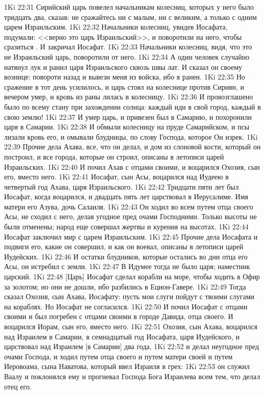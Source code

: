 \vs 1Ki 22:31 Сирийский царь повелел начальникам колесниц, которых у него было тридцать два, сказав: не сражайтесь ни с малым, ни с великим, а только с одним царем Израильским.
\vs 1Ki 22:32 Начальники колесниц, увидев Иосафата, подумали: <<верно это царь Израильский>>, и поворотили на него, чтобы сразиться . И закричал Иосафат.
\vs 1Ki 22:33 Начальники колесниц, видя, что это не Израильский царь, поворотили от него.
\vs 1Ki 22:34 А один человек случайно натянул лук и ранил царя Израильского сквозь швы лат. И сказал он своему вознице: повороти назад и вывези меня из войска, ибо я ранен.
\vs 1Ki 22:35 Но сражение в тот день усилилось, и царь стоял на колеснице против Сириян, и вечером умер, и кровь из раны лилась в колесницу.
\vs 1Ki 22:36 И провозглашено было по всему стану при захождении солнца: каждый иди в свой город, каждый в свою землю!
\vs 1Ki 22:37 И умер царь, и привезен был в Самарию, и похоронили царя в Самарии.
\vs 1Ki 22:38 И обмыли колесницу на пруде Самарийском, и псы лизали кровь его, и омывали блудницы, по слову Господа, которое Он изрек.
\rsbpar\vs 1Ki 22:39 Прочие дела Ахава, все, что он делал, и дом из слоновой кости, который он построил, и все города, которые он строил, описаны в летописи царей Израильских.
\vs 1Ki 22:40 И почил Ахав с отцами своими, и воцарился Охозия, сын его, вместо него.
\rsbpar\vs 1Ki 22:41 Иосафат, сын Асы, воцарился над Иудеею в четвертый год Ахава, царя Израильского.
\vs 1Ki 22:42 Тридцати пяти лет был Иосафат, когда воцарился, и двадцать пять лет царствовал в Иерусалиме. Имя матери его Азува, дочь Салаиля.
\vs 1Ki 22:43 Он ходил во всем путем отца своего Асы, не сходил с него, делая угодное пред очами Господними. Только высоты не были отменены; народ еще совершал жертвы и курения на высотах.
\vs 1Ki 22:44 Иосафат заключил мир с царем Израильским.
\rsbpar\vs 1Ki 22:45 Прочие дела Иосафата и подвиги его, какие он совершил, и как он воевал, описаны в летописи царей Иудейских.
\vs 1Ki 22:46 И остатки блудников, которые остались во дни отца его Асы, он истребил с земли.
\vs 1Ki 22:47 В Идумее тогда не было царя;  наместник царский.
\vs 1Ki 22:48 [Царь] Иосафат сделал корабли на море, чтобы ходить в Офир за золотом; но они не дошли, ибо разбились в Ецион-Гавере.
\vs 1Ki 22:49 Тогда сказал Охозия, сын Ахава, Иосафату: пусть мои слуги пойдут с твоими слугами на кораблях. Но Иосафат не согласился.
\vs 1Ki 22:50 И почил Иосафат с отцами своими и был погребен с отцами своими в городе Давида, отца своего. И воцарился Иорам, сын его, вместо него.
\rsbpar\vs 1Ki 22:51 Охозия, сын Ахава, воцарился над Израилем в Самарии, в семнадцатый год Иосафата, царя Иудейского, и царствовал над Израилем [в Самарии] два года,
\vs 1Ki 22:52 и делал неугодное пред очами Господа, и ходил путем отца своего и путем матери своей и путем Иеровоама, сына Наватова, который ввел Израиля в грех:
\vs 1Ki 22:53 он служил Ваалу и поклонялся ему и прогневал Господа Бога Израилева всем тем, что делал отец его.
